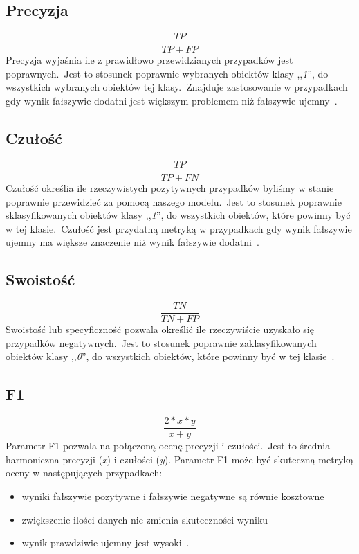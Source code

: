 \subsection{Precyzja}
\begin{equation}\label{math:prec}
    \frac{TP}{TP + FP}
\end{equation}
Precyzja wyjaśnia ile z prawidłowo przewidzianych przypadków jest poprawnych.\ Jest to stosunek poprawnie wybranych obiektów klasy ,,\textit{1}'', do wszystkich wybranych obiektów tej klasy.\ Znajduje zastosowanie w przypadkach gdy wynik fałszywie dodatni jest większym problemem niż fałszywie ujemny~\cite{Agrawal2024, Blyszcz2022, Kulkarni2020}.

\subsection{Czułość}
\begin{equation}\label{math:rec}
    \frac{TP}{TP + FN}
\end{equation}
Czułość określia ile rzeczywistych pozytywnych przypadków byliśmy w stanie poprawnie przewidzieć za pomocą naszego modelu.\ Jest to stosunek poprawnie sklasyfikowanych obiektów klasy ,,\textit{1}'', do wszystkich obiektów, które powinny być w tej klasie.\ Czułość jest przydatną metryką w przypadkach gdy wynik fałszywie ujemny ma większe znaczenie niż wynik fałszywie dodatni~\cite{Agrawal2024, Blyszcz2022, Kulkarni2020}.

\subsection{Swoistość}
\begin{equation}\label{math:swo}
    \frac{TN}{TN + FP}
\end{equation}
Swoistość lub specyficzność pozwala określić ile rzeczywiście uzyskało się przypadków negatywnych.\ Jest to stosunek poprawnie zaklasyfikowanych obiektów klasy ,,\textit{0}'', do wszystkich obiektów, które powinny być w tej klasie~\cite{Agrawal2024}.

\subsection{F1}
\begin{equation}\label{math:f1}
   \frac{2*x*y}{x + y}
\end{equation}
Parametr F1 pozwala na połączoną ocenę precyzji i czułości.\ Jest to średnia harmoniczna precyzji (\textit{x}) i czułości (\textit{y}). Parametr F1 może być skuteczną metryką oceny w następujących przypadkach:
\begin{itemize}
    \item wyniki fałszywie pozytywne i fałszywie negatywne są równie kosztowne
    \item zwiększenie ilości danych nie zmienia skuteczności wyniku
    \item wynik prawdziwie ujemny jest wysoki~\cite{Agrawal2024}.
\end{itemize}

